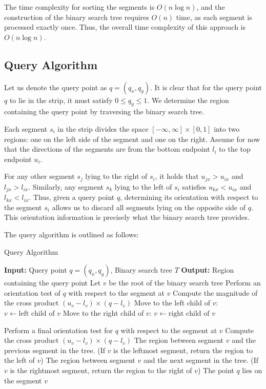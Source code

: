 \documentclass[12pt]{article}
\begin{document}
The time complexity for sorting the segments is \( O(n \log n) \), and the construction of the binary search tree requires \( O(n) \) time, as each segment is processed exactly once. Thus, the overall time complexity of this approach is \( O(n \log n) \).



\subsection*{Query Algorithm}

Let us denote the query point as \(q = (q_x, q_y)\). It is clear that for the query point \(q\) to lie in the strip, it must satisfy \(0 \leq q_y \leq 1\). We determine the region containing the query point by traversing the binary search tree.

Each segment \(s_i\) in the strip divides the space \([-\infty, \infty] \times [0, 1]\) into two regions: one on the left side of the segment and one on the right. Assume for now that the directions of the segments are from the bottom endpoint \(l_i\) to the top endpoint \(u_i\). 

For any other segment \(s_j\) lying to the right of \(s_i\), it holds that \(u_{jx} > u_{ix}\) and \(l_{jx} > l_{ix}\). Similarly, any segment \(s_k\) lying to the left of \(s_i\) satisfies \(u_{kx} < u_{ix}\) and \(l_{kx} < l_{ix}\). Thus, given a query point \(q\), determining its orientation with respect to the segment \(s_i\) allows us to discard all segments lying on the opposite side of \(q\). This orientation information is precisely what the binary search tree provides. 

The query algorithm is outlined as follows:

\begin{algorithm}
\caption{Query Algorithm} \label{alg:query}
\begin{algorithmic}[1]
\STATE \textbf{Input:} Query point \(q = (q_x, q_y)\), Binary search tree \(T\)
\STATE \textbf{Output:} Region containing the query point
\STATE Let \(v\) be the root of the binary search tree
    \STATE Perform an orientation test of \(q\) with respect to the segment at \(v\)
    \STATE Compute the magnitude of the cross product \((u_v - l_v) \times (q - l_v)\)
        \STATE Move to the left child of \(v\): \(v \gets \text{left child of } v\)
    \ELSE
        \STATE Move to the right child of \(v\): \(v \gets \text{right child of } v\)
    \ENDIF
\ENDWHILE

\STATE Perform a final orientation test for \(q\) with respect to the segment at \(v\)
\STATE Compute the cross product \((u_v - l_v) \times (q - l_v)\)
    \RETURN The region between segment \(v\) and the previous segment in the tree. (If \(v\) is the leftmost segment, return the region to the left of \(v\))
    \RETURN The region between segment \(v\) and the next segment in the tree. (If \(v\) is the rightmost segment, return the region to the right of \(v\))
\ELSE
    \RETURN The point \(q\) lies on the segment \(v\)
\ENDIF
\end{algorithmic}
\end{algorithm}
\end{document}
